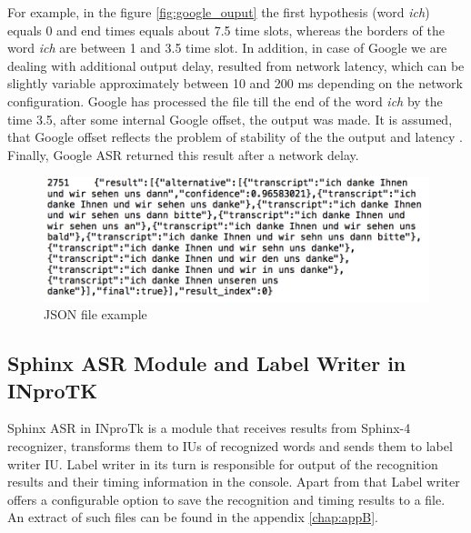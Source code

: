 For example, in the figure  \ref {fig:google_ouput} the first hypothesis (word
\textit {ich}) equals 0 and end times equals about 7.5 time slots, whereas the
borders of the word \textit {ich} are between 1 and 3.5 time slot. In addition,
in case of Google we are dealing with additional output delay, resulted from network latency, which can be slightly variable approximately
between 10 and 200 ms depending on the network configuration. Google has
processed the file till the end of the word \textit {ich} by the time 3.5,
after some internal Google offset, the output was made.
It is assumed, that Google offset reflects the problem of stability of the
the output and latency \parencite {mcgrawgrauenstein2012}. Finally, Google ASR returned this result after 
a network delay.  
 \begin{figure}[htbp]
  \centering
   \includegraphics[width=1\textwidth]{images/json_extr.png}
    \caption{JSON file example}
      \label{fig:json_ouput}
\end{figure}
\subsection {Sphinx ASR Module and Label Writer in INproTK}
Sphinx ASR in INproTk is a module that receives results from Sphinx-4
recognizer, transforms them to IUs of recognized words and sends them
to label writer IU.   Label writer in its turn
is responsible for output of the recognition results and  their timing
information in the console. Apart from that Label writer  offers a configurable
option to save the recognition and timing results to a file. An extract of such
files can be found in the appendix \ref{chap:appB}. 

